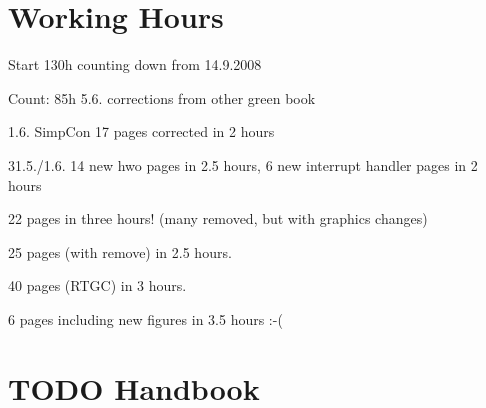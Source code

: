 \section{Working Hours}

Start 130h counting down from 14.9.2008

Count: 85h 5.6. corrections from other green book



1.6. SimpCon 17 pages corrected in 2 hours

31.5./1.6. 14 new hwo pages in 2.5 hours, 6 new interrupt handler
pages in 2 hours

22 pages in three hours! (many removed, but with graphics changes)

25 pages (with remove) in 2.5 hours.

40 pages (RTGC) in 3 hours.

6 pages including new figures in 3.5 hours :-(

\section{TODO Handbook}


